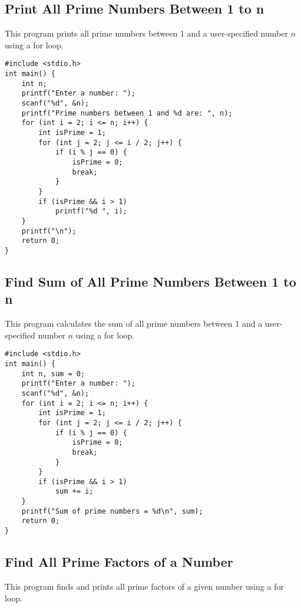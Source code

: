 \documentclass[a4paper,12pt]{article}
\begin{document}
\newpage

\subsection{Print All Prime Numbers Between 1 to n}
This program prints all prime numbers between 1 and a user-specified number \(n\) using a for loop.

\begin{lstlisting}[caption={Print All Prime Numbers Between 1 to n}]
#include <stdio.h>
int main() {
    int n;
    printf("Enter a number: ");
    scanf("%d", &n);
    printf("Prime numbers between 1 and %d are: ", n);
    for (int i = 2; i <= n; i++) {
        int isPrime = 1;
        for (int j = 2; j <= i / 2; j++) {
            if (i % j == 0) {
                isPrime = 0;
                break;
            }
        }
        if (isPrime && i > 1)
            printf("%d ", i);
    }
    printf("\n");
    return 0;
}
\end{lstlisting}

\newpage

\subsection{Find Sum of All Prime Numbers Between 1 to n}
This program calculates the sum of all prime numbers between 1 and a user-specified number \(n\) using a for loop.

\begin{lstlisting}[caption={Find Sum of All Prime Numbers Between 1 to n}]
#include <stdio.h>
int main() {
    int n, sum = 0;
    printf("Enter a number: ");
    scanf("%d", &n);
    for (int i = 2; i <= n; i++) {
        int isPrime = 1;
        for (int j = 2; j <= i / 2; j++) {
            if (i % j == 0) {
                isPrime = 0;
                break;
            }
        }
        if (isPrime && i > 1)
            sum += i;
    }
    printf("Sum of prime numbers = %d\n", sum);
    return 0;
}
\end{lstlisting}

\newpage

\subsection{Find All Prime Factors of a Number}
This program finds and prints all prime factors of a given number using a for loop.
\end{document}
